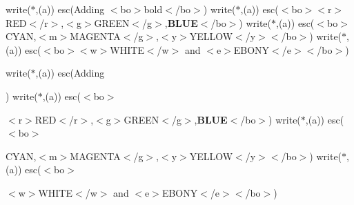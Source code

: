 write($\ast$,\textquotesingle{}(a)\textquotesingle{}) esc(\textquotesingle{}Adding $<$bo$>$bold$<$/bo$>$\textquotesingle{}) write($\ast$,\textquotesingle{}(a)\textquotesingle{}) esc(\textquotesingle{}$<$bo$>$$<$r$>$R\+ED$<$/r$>$,$<$g$>$G\+R\+E\+EN$<$/g$>$,{\bfseries B\+L\+UE}$<$/bo$>$\textquotesingle{}) write($\ast$,\textquotesingle{}(a)\textquotesingle{}) esc(\textquotesingle{}$<$bo$>${\ttfamily C\+Y\+AN},$<$m$>$M\+A\+G\+E\+N\+TA$<$/g$>$,$<$y$>$Y\+E\+L\+L\+OW$<$/y$>$$<$/bo$>$\textquotesingle{}) write($\ast$,\textquotesingle{}(a)\textquotesingle{}) esc(\textquotesingle{}$<$bo$>$$<$w$>$W\+H\+I\+TE$<$/w$>$ and $<$e$>$E\+B\+O\+NY$<$/e$>$$<$/bo$>$\textquotesingle{})

write($\ast$,\textquotesingle{}(a)\textquotesingle{}) esc(\textquotesingle{}Adding 
\begin{DoxyItemize}
\item 
\end{DoxyItemize}\textquotesingle{}) write($\ast$,\textquotesingle{}(a)\textquotesingle{}) esc(\textquotesingle{}$<$bo$>$
\begin{DoxyItemize}
\item 
\end{DoxyItemize}$<$r$>$R\+ED$<$/r$>$,$<$g$>$G\+R\+E\+EN$<$/g$>$,{\bfseries B\+L\+UE}$<$/bo$>$\textquotesingle{}) write($\ast$,\textquotesingle{}(a)\textquotesingle{}) esc(\textquotesingle{}$<$bo$>$
\begin{DoxyItemize}
\item 
\end{DoxyItemize}{\ttfamily C\+Y\+AN},$<$m$>$M\+A\+G\+E\+N\+TA$<$/g$>$,$<$y$>$Y\+E\+L\+L\+OW$<$/y$>$$<$/bo$>$\textquotesingle{}) write($\ast$,\textquotesingle{}(a)\textquotesingle{}) esc(\textquotesingle{}$<$bo$>$
\begin{DoxyItemize}
\item 
\end{DoxyItemize}$<$w$>$W\+H\+I\+TE$<$/w$>$ and $<$e$>$E\+B\+O\+NY$<$/e$>$$<$/bo$>$\textquotesingle{})

